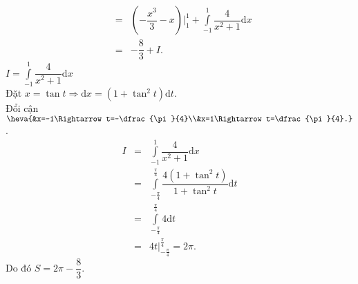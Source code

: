 \begin{ex}
{\begin{eqnarray*}
			&=&\left(-\dfrac{x^3}{3}-x\right)\bigg|_1^1+\displaystyle \int \limits_{-1}^1 \dfrac{ 4 }{x^2+1} \mathrm{d}x\\
			&=&-\dfrac{8}{3}+I.
		\end{eqnarray*}
		$I=\displaystyle \int \limits_{-1}^1 \dfrac{ 4 }{x^2+1} \mathrm{d}x$\\
		Đặt $x=\tan t\Rightarrow \mathrm{d}x=(1+\tan^2t)\mathrm{d}t$.\\
		Đổi cận $\heva{&x=-1\Rightarrow t=-\dfrac{\pi}{4}\\&x=1\Rightarrow t=\dfrac{\pi}{4}.}$.\\
		\begin{eqnarray*}I&=&\displaystyle \int \limits_{-1}^1 \dfrac{ 4 }{x^2+1} \mathrm{d}x\\
			&=&\displaystyle \int \limits_{-\frac{\pi}{4}}^{\frac{\pi}{4}} \dfrac{ 4(1+\tan^2 t) }{1+\tan^2 t} \mathrm{d}t\\
			&=&\displaystyle \int \limits_{-\frac{\pi}{4}}^{\frac{\pi}{4}} 4 \mathrm{d}t\\
			&=&4t\bigg|_{-\frac{\pi}{4}}^{\frac{\pi}{4}}=2\pi.
		\end{eqnarray*}
		Do đó $S=2\pi-\dfrac{8}{3}.$
	}
\end{ex}



